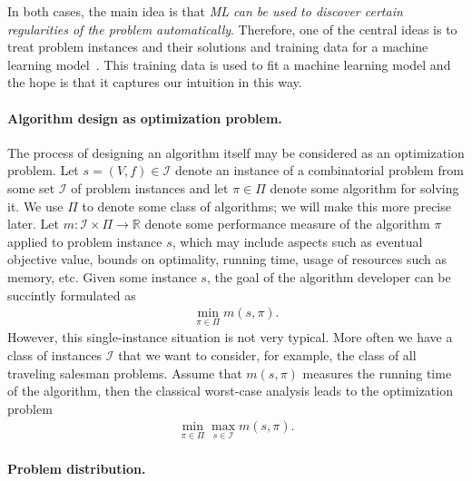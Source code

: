 \documentclass[a4paper]{report}
\theoremstyle{definition}
\theoremstyle{plain}
\begin{document}
In both cases, the main idea is that \emph{ML can be used to discover certain
  regularities of the problem automatically}.
%
Therefore, one of the central ideas is to treat problem instances and their
solutions and training data for a machine learning
model~\cite{bengioMachineLearningCombinatorial2020}.
%
This training data is used to fit a machine learning model and the hope is that
it captures our intuition in this way.

\paragraph{Algorithm design as optimization problem.}

The process of designing an algorithm itself may be considered as an
optimization problem.
%
Let $s = (V, f) \in \mathcal{I}$ denote an instance of a combinatorial problem
from some set $\mathcal{I}$ of problem instances and let $\pi \in \Pi$ denote
some algorithm for solving it. We use $\Pi$ to denote some class of algorithms;
we will make this more precise later.
%
Let $m : \mathcal{I} \times \Pi \rightarrow \mathbb{R}$ denote some performance
measure of the algorithm $\pi$ applied to problem instance $s$, which may
include aspects such as eventual objective value, bounds on optimality, running
time, usage of resources such as memory, etc.
%
Given some instance $s$, the goal of the algorithm developer can be succintly
formulated as
\begin{align}
  \min_{\pi \in \Pi} m(s, \pi) .
\end{align}
However, this single-instance situation is not very typical. More often we have
a class of instances $\mathcal{I}$ that we want to consider, for example, the
class of all traveling salesman problems.
%
Assume that $m(s, \pi)$ measures the running time of the algorithm, then the
classical worst-case analysis leads to the optimization problem
\begin{align}
  \label{eq:min-max-runtime}
  \min_{\pi \in \Pi} \max_{s \in \mathcal{I}} m(s, \pi) .
\end{align}

\paragraph{Problem distribution.}
\end{document}
